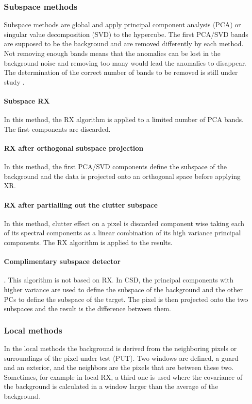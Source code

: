 \subsubsection{Subspace methods}
Subspace methods are global and apply principal component analysis (PCA) or singular value decomposition (SVD) to the hypercube. The first PCA/SVD bands are supposed to be the background and are removed differently by each method. Not removing enough bands means that the anomalies can be lost in the background noise and removing too many would lead the anomalies to disappear. The determination of the correct number of bands to be removed is still under study \cite{borghys_hyperspectral_2012}.

\paragraph{Subspace RX}
In this method, the RX algorithm is applied to a limited number of PCA bands. The first components are discarded.

\paragraph{RX after orthogonal subspace projection}
In this method, the first PCA/SVD components define the subspace of the background and the data is projected onto an orthogonal space before applying XR.

\paragraph{RX after partialling out the clutter subspace}
In this method, clutter effect on a pixel is discarded component wise taking each of its spectral components as a linear combination of its high variance principal components. The RX algorithm is applied to the results.

\paragraph{Complimentary subspace detector}.
This algorithm is not based on RX. In CSD, the principal components with higher variance are used to define the subspace of the background and the other PCs to define the subspace of the target. The pixel is then projected onto the two subspaces and the result is the difference between them.

\subsubsection{Local methods}
In the local methods the background is derived from the neighboring pixels or surroundings of the pixel under test (PUT). Two windows are defined, a guard and an exterior, and the neighbors are the pixels that are between these two. Sometimes, for example in local RX, a third one is used where the covariance of the background is calculated in a window larger than the average of the background.

